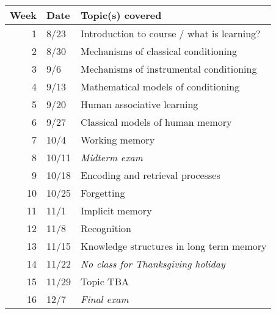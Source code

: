\documentclass[10pt]{article}
\begin{document}
\begin{center}
\begin{tabular}{rll}
Week & Date & Topic(s) covered\\
\hline
1 & 8/23 & Introduction to course / what is learning?\\
2 & 8/30 & Mechanisms of classical conditioning\\
3 & 9/6 & Mechanisms of instrumental conditioning\\
4 & 9/13 & Mathematical models of conditioning\\
5 & 9/20 & Human associative learning\\
6 & 9/27 & Classical models of human memory\\
7 & 10/4 & Working memory\\
8 & 10/11 & \emph{Midterm exam}\\
9 & 10/18 & Encoding and retrieval processes\\
10 & 10/25 & Forgetting\\
11 & 11/1 & Implicit memory\\
12 & 11/8 & Recognition\\
13 & 11/15 & Knowledge structures in long term memory\\
14 & 11/22 & \emph{No class for Thanksgiving holiday}\\
15 & 11/29 & Topic TBA\\
16 & 12/7 & \emph{Final exam}\\
\end{tabular}
\end{center}
\end{document}
